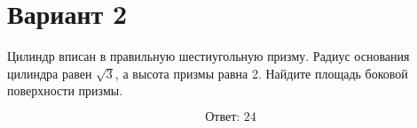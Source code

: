 \documentclass[12pt,a4paper]{article}
\begin{document}
\section*{Вариант 2}

Цилиндр вписан в правильную шестиугольную призму. Радиус основания цилиндра равен \(\sqrt{3}\), а высота призмы равна 2. Найдите площадь боковой поверхности призмы.

\begin{center}
\end{center}

\[
\boxed{\text{Ответ: }24}
\]
\end{document}
